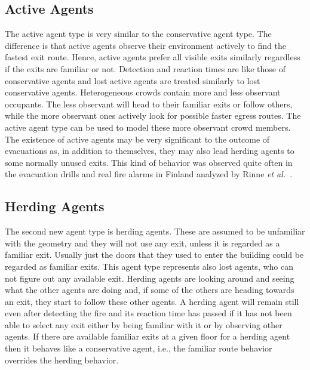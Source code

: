 \documentclass[12pt,a4paper,final,twoside]{stylevk}
\begin{document}
\subsection{Active Agents}\label{Sec_ActiveAgents}

\noindent The active agent type is very similar to the conservative
agent type.  The difference is that active agents observe their
environment actively to find the fastest exit route.  Hence, active
agents prefer all visible exits similarly regardless if the exits are
familiar or not.  Detection and reaction times are like those of
conservative agents and lost active agents are treated similarly to
lost conservative agents.  Heterogeneous crowds contain more and less
observant occupants.  The less observant will head to their familiar
exits or follow others, while the more observant ones actively look
for possible faster egress routes.  The active agent type can be used
to model these more observant crowd members.  The existence of active
agents may be very significant to the outcome of evacuations as, in
addition to themselves, they may also lead herding agents to some
normally unused exits.  This kind of behavior was observed quite often
in the evacuation drills and real fire alarms in Finland analyzed by
Rinne \emph{et al.}~\cite{Rinne10}.


\subsection{Herding Agents}\label{Sec_HerdingAgents}

\noindent The second new agent type is herding agents.  These are
assumed to be unfamiliar with the geometry and they will not use any
exit, unless it is regarded as a familiar exit.  Usually just the
doors that they used to enter the building could be regarded as
familiar exits.  This agent type represents also lost agents, who can
not figure out any available exit.  Herding agents are looking around
and seeing what the other agents are doing and, if some of the others
are heading towards an exit, they start to follow these other agents.
A herding agent will remain still even after detecting the fire and
its reaction time has passed if it has not been able to select any
exit either by being familiar with it or by observing other agents.
If there
are available familiar exits at a given floor for a herding agent then
it behaves like a conservative agent, i.e., the familiar route
behavior overrides the herding behavior.
\end{document}
